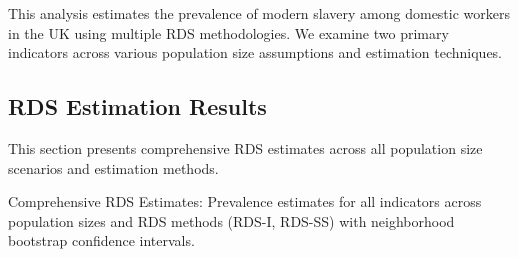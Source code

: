\documentclass[
  12pt,
  letterpaper,
  DIV=11,
  numbers=noendperiod]{scrartcl}
\theoremstyle{plain}
\theoremstyle{definition}
\begin{document}
This analysis estimates the prevalence of modern slavery among domestic
workers in the UK using multiple RDS methodologies. We examine two
primary indicators across various population size assumptions and
estimation techniques.

\subsection{RDS Estimation Results}\label{rds-estimation-results}

This section presents comprehensive RDS estimates across all population
size scenarios and estimation methods.

\begin{table}

\caption{\label{tbl-rds-comprehensive}Comprehensive RDS Estimates:
Prevalence estimates for all indicators across population sizes and RDS
methods (RDS-I, RDS-SS) with neighborhood bootstrap confidence
intervals.}

\centering{

\begin{verbatim}
\begin{landscape}
\begin{table}[!h]
\centering\begingroup\fontsize{6}{8}\selectfont


\end{verbatim}}
\end{table}
\end{document}

